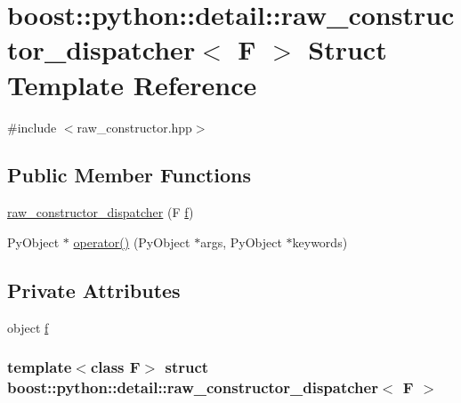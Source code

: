 \hypertarget{structboost_1_1python_1_1detail_1_1raw__constructor__dispatcher}{\section{boost\-:\-:python\-:\-:detail\-:\-:raw\-\_\-constructor\-\_\-dispatcher$<$ \-F $>$ \-Struct \-Template \-Reference}
\label{structboost_1_1python_1_1detail_1_1raw__constructor__dispatcher}
}


{\ttfamily \#include $<$raw\-\_\-constructor.\-hpp$>$}

\subsection*{\-Public \-Member \-Functions}
\begin{DoxyCompactItemize}
\item 
\hyperlink{structboost_1_1python_1_1detail_1_1raw__constructor__dispatcher_a24c048cfc2d50e1897e6a779eef33f5c}{raw\-\_\-constructor\-\_\-dispatcher} (\-F \hyperlink{structboost_1_1python_1_1detail_1_1raw__constructor__dispatcher_a055de51d7e8492c050508aa131ec1dd5}{f})
\item 
\-Py\-Object $\ast$ \hyperlink{structboost_1_1python_1_1detail_1_1raw__constructor__dispatcher_ae3fe9c3c2b28ec59a57468fc05381a96}{operator()} (\-Py\-Object $\ast$args, \-Py\-Object $\ast$keywords)
\end{DoxyCompactItemize}
\subsection*{\-Private \-Attributes}
\begin{DoxyCompactItemize}
\item 
object \hyperlink{structboost_1_1python_1_1detail_1_1raw__constructor__dispatcher_a055de51d7e8492c050508aa131ec1dd5}{f}
\end{DoxyCompactItemize}
\subsubsection*{template$<$class F$>$ struct boost\-::python\-::detail\-::raw\-\_\-constructor\-\_\-dispatcher$<$ F $>$}



